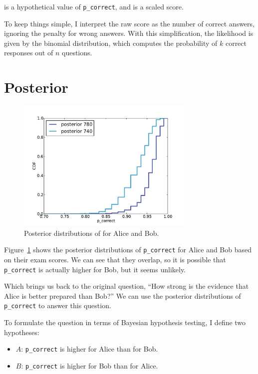 \documentclass[12pt]{book}
\theoremstyle{exercise}
\begin{document}
 is a hypothetical
value of \verb"p_correct", and  is a scaled score.

To keep things simple, I interpret the raw score as the number of
correct answers, ignoring the penalty for wrong answers.  With
this simplification, the likelihood is given by the binomial
distribution, which computes the probability of $k$ correct
responses out of $n$ questions.


\section{Posterior}

\begin{figure}
\centerline{\includegraphics[height=2.5in]{figs/sat_posteriors_p_corr.pdf}}
\caption{Posterior distributions of  for Alice and Bob.}
\label{fig.satposterior1}
\end{figure}

Figure~\ref{fig.satposterior1} shows the posterior distributions
of \verb"p_correct" for Alice and Bob based on their exam scores.
We can see that they overlap, so it is possible that \verb"p_correct"
is actually higher for Bob, but it seems unlikely.

Which brings us back to the original question, ``How strong is the
evidence that Alice is better prepared than Bob?''  We can use the
posterior distributions of \verb"p_correct" to answer this question.

To formulate the question in terms of Bayesian hypothesis testing,
I define two hypotheses:

\begin{itemize}

\item $A$: \verb"p_correct" is higher for Alice than for Bob.

\item $B$: \verb"p_correct" is higher for Bob than for Alice.

\end{itemize}
\end{document}

